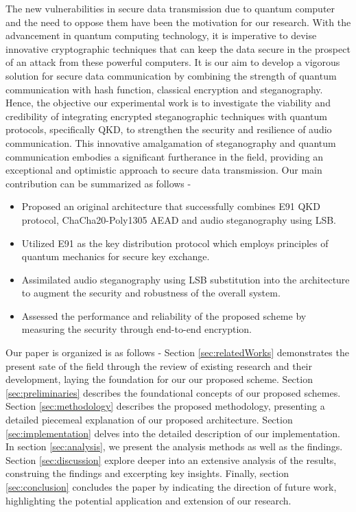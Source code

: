 \documentclass[12pt]{article}
\begin{document}
The new vulnerabilities in secure data transmission due to quantum computer and the need to oppose them have been the motivation for our research. With the advancement in quantum computing technology, it is imperative to devise innovative cryptographic techniques that can keep the data secure in the prospect of an attack from these powerful computers. It is our aim to develop a vigorous solution for secure data communication by combining the strength of quantum communication with hash function, classical encryption and steganography. Hence, the objective our experimental work is to investigate the viability and credibility of integrating encrypted steganographic techniques with quantum protocols, specifically QKD, to strengthen the security and resilience of audio communication. This innovative amalgamation of steganography and quantum communication embodies a significant furtherance in the field, providing an exceptional and optimistic approach to secure data transmission. Our main contribution can be summarized as follows -
\begin{itemize}
  \item Proposed an original architecture that successfully combines E91 QKD protocol, ChaCha20-Poly1305 AEAD and audio steganography using LSB.
  \item Utilized E91 as the key distribution protocol which employs principles of quantum mechanics for secure key exchange.
  \item Assimilated audio steganography using LSB substitution into the architecture to augment the security and robustness of the overall system.
  \item Assessed the performance and reliability of the proposed scheme by measuring the security through end-to-end encryption.
\end{itemize}

Our paper is organized is as follows - Section \ref{sec:relatedWorks} demonstrates the present sate of the field through the review of existing research and their development, laying the foundation for our our proposed scheme. Section \ref{sec:preliminaries} describes the foundational concepts of our proposed schemes. Section \ref{sec:methodology} describes the proposed methodology, presenting a detailed piecemeal explanation of our proposed architecture. Section \ref{sec:implementation} delves into the detailed description of our implementation. In section \ref{sec:analysis}, we present the analysis methods as well as the findings. Section \ref{sec:discussion} explore deeper into an extensive analysis of the results, construing the findings and excerpting key insights. Finally, section \ref{sec:conclusion} concludes the paper by indicating the direction of future work, highlighting the potential application and extension of our research.
\end{document}
